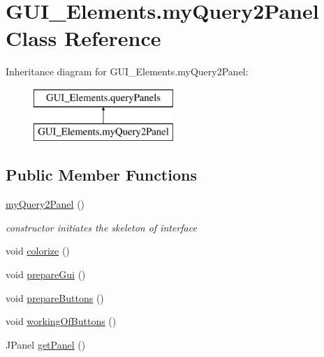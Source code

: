 \hypertarget{class_g_u_i___elements_1_1my_query2_panel}{}\section{G\+U\+I\+\_\+\+Elements.\+my\+Query2\+Panel Class Reference}
\label{class_g_u_i___elements_1_1my_query2_panel}
Inheritance diagram for G\+U\+I\+\_\+\+Elements.\+my\+Query2\+Panel\+:\begin{figure}[H]
\begin{center}
\leavevmode
\includegraphics[height=2.000000cm]{class_g_u_i___elements_1_1my_query2_panel}
\end{center}
\end{figure}
\subsection*{Public Member Functions}
\begin{DoxyCompactItemize}
\item 
\hyperlink{class_g_u_i___elements_1_1my_query2_panel_ac3fc56f3c07e6c0bc190e6e5f4b3a73b}{my\+Query2\+Panel} ()
\begin{DoxyCompactList}\small\item\em constructor initiates the skeleton of interface \end{DoxyCompactList}\item 
void \hyperlink{class_g_u_i___elements_1_1my_query2_panel_a047854ba4d510a94711c82daa2ca81bb}{colorize} ()
\item 
void \hyperlink{class_g_u_i___elements_1_1my_query2_panel_ad99535b063e2d3ff044560245837eecf}{prepare\+Gui} ()
\item 
void \hyperlink{class_g_u_i___elements_1_1my_query2_panel_a71b3714eb5b1a303b8229ef240415524}{prepare\+Buttons} ()
\item 
void \hyperlink{class_g_u_i___elements_1_1my_query2_panel_afed162247688600c698720b4ed2351c7}{working\+Of\+Buttons} ()
\item 
J\+Panel \hyperlink{class_g_u_i___elements_1_1my_query2_panel_a45bac12608ab0c76e4583fad0aa17cb0}{get\+Panel} ()
\end{DoxyCompactItemize}


